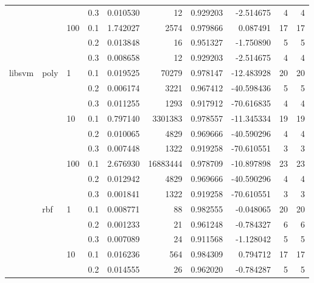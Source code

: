 \begin{table}[H]
\begin{tabular}{llllrrrrrr}
       &     &     & 0.3 &     0.010530 &        12 &  0.929203 &  -2.514675 &           4 &         4 \\
       &     & 100 & 0.1 &     1.742027 &      2574 &  0.979866 &   0.087491 &          17 &        17 \\
       &     &     & 0.2 &     0.013848 &        16 &  0.951327 &  -1.750890 &           5 &         5 \\
       &     &     & 0.3 &     0.008658 &        12 &  0.929203 &  -2.514675 &           4 &         4 \\
libsvm & poly & 1   & 0.1 &     0.019525 &     70279 &  0.978147 & -12.483928 &          20 &        20 \\
       &     &     & 0.2 &     0.006174 &      3221 &  0.967412 & -40.598436 &           5 &         5 \\
       &     &     & 0.3 &     0.011255 &      1293 &  0.917912 & -70.616835 &           4 &         4 \\
       &     & 10  & 0.1 &     0.797140 &   3301383 &  0.978557 & -11.345334 &          19 &        19 \\
       &     &     & 0.2 &     0.010065 &      4829 &  0.969666 & -40.590296 &           4 &         4 \\
       &     &     & 0.3 &     0.007448 &      1322 &  0.919258 & -70.610551 &           3 &         3 \\
       &     & 100 & 0.1 &     2.676930 &  16883444 &  0.978709 & -10.897898 &          23 &        23 \\
       &     &     & 0.2 &     0.012942 &      4829 &  0.969666 & -40.590296 &           4 &         4 \\
       &     &     & 0.3 &     0.001841 &      1322 &  0.919258 & -70.610551 &           3 &         3 \\
       & rbf & 1   & 0.1 &     0.008771 &        88 &  0.982555 &  -0.048065 &          20 &        20 \\
       &     &     & 0.2 &     0.001233 &        21 &  0.961248 &  -0.784327 &           6 &         6 \\
       &     &     & 0.3 &     0.007089 &        24 &  0.911568 &  -1.128042 &           5 &         5 \\
       &     & 10  & 0.1 &     0.016236 &       564 &  0.984309 &   0.794712 &          17 &        17 \\
       &     &     & 0.2 &     0.014555 &        26 &  0.962020 &  -0.784287 &           5 &         5 \\

\end{tabular}
\end{table}
